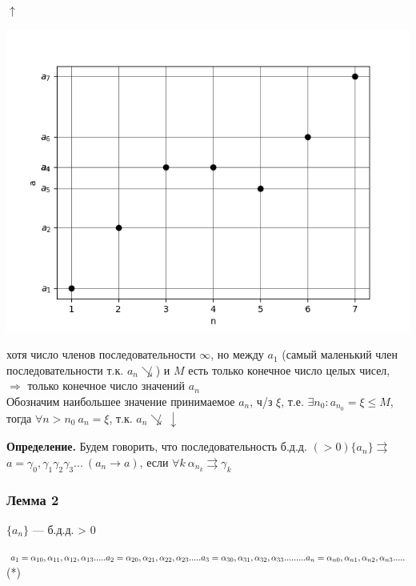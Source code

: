 \documentclass{article}
\begin{document}
    \(\uparrow\)

    \includegraphics[scale=0.6]{8}
    
    хотя число членов последовательности \(\infty\), но между \(a_1\) (самый маленький член последовательности т.к. \( a_n \not\searrow \)) и \(M\) есть только конечное число целых чисел, \(\Rightarrow\) только конечное число значений \(a_n\)\\
    Обозначим наибольшее значение принимаемое \( a_n \), ч/з \( \xi \), т.е. \( \exists n_0: a_{n_0} = \xi \leq M \), тогда \( \forall n > n_0\ a_n = \xi \), т.к. \( a_n \not \searrow\ \downarrow \)
    
    \textbf{Определение.} Будем говорить, что последовательность б.д.д. \( (>0) \{a_n\} \rightrightarrows \)\\
    \( a = \gamma_0,\gamma_1\gamma_2\gamma_3...\ (a_n \rightarrow a) \), если \(\forall k \ \alpha_{n_k} \rightrightarrows \gamma_k\)

    \subsubsection{Лемма 2}
    
    \(\{a_n\}\) --- б.д.д. >  0

    \(a_1 = \alpha_{10},\alpha_{11},\alpha_{12},\alpha_{13}.....\\ a_2 = \alpha_{20},\alpha_{21},\alpha_{22},\alpha_{23}.....\\ a_3 = \alpha_{30},\alpha_{31},\alpha_{32},\alpha_{33}.....\\
    .\\.\\.\\.\\ a_n = \alpha_{n0},\alpha_{n1},\alpha_{n2},\alpha_{n3}.....\)(*)
\end{document}
